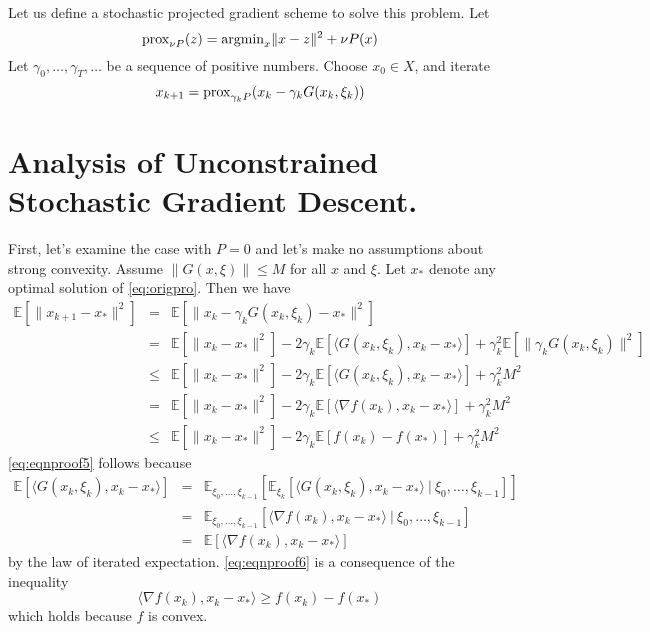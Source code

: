 Let us define a stochastic projected gradient scheme to solve this problem. Let
\begin{equation}\label{eq:stoprojgra}
{\rm prox}_{\nu P}(z)={\rm argmin}_x \|x-z\|^2+\nu P(x)
\end{equation}
Let $\gamma_0,\ldots,\gamma_T,\ldots$ be a sequence of positive numbers. Choose $x_0 \in X$, and iterate
\begin{equation}\label{eq:stoprojgraiter}
x_{k+1} ={\rm prox}_{\gamma_k P}(x_k-\gamma_k G(x_k,\xi_k))
\end{equation}

\section{Analysis of Unconstrained Stochastic Gradient Descent.}
First, let's examine the case with $P = 0$ and let's make no assumptions about strong convexity. Assume $\|G(x, \xi)\| \leq M$ for all $x$ and $\xi$. Let $x_*$ denote any optimal solution of \eqref{eq:origpro}. Then we have
\begin{eqnarray}
\mathbb{E}[\|x_{k+1}-x_*\|^2]&=&\mathbb{E}[\|x_{k}-\gamma_k G(x_k,\xi_k)-x_*\|^2]  \nonumber \\
&=&\mathbb{E}[\|x_{k}-x_*\|^2]- 2\gamma_k\mathbb{E}[\langle G(x_k,\xi_k), x_k-x_*\rangle ]+ \gamma_k^2 \mathbb{E}[\|\gamma_k G(x_k,\xi_k)\|^2]  \\
&\leq&\mathbb{E}[\|x_{k}-x_*\|^2]- 2\gamma_k\mathbb{E}[\langle G(x_k,\xi_k), x_k-x_*\rangle ]+ \gamma_k^2 M^2  \\
&=&\mathbb{E}[\|x_{k}-x_*\|^2]- 2\gamma_k\mathbb{E}[\langle \nabla f(x_k), x_k-x_*\rangle ]+ \gamma_k^2 M^2 \label{eq:eqnproof5} \\
&\leq& \mathbb{E}[\|x_{k}-x_*\|^2]- 2\gamma_k\mathbb{E}[f(x_k)-f(x_*)]+ \gamma_k^2 M^2 \label{eq:eqnproof6}
\end{eqnarray}
\eqref{eq:eqnproof5} follows because
\begin{eqnarray}
\mathbb{E}[\langle G(x_k,\xi_k), x_k-x_*\rangle ]&=&\mathbb{E}_{\xi_0,\ldots,\xi_{k-1}}[\mathbb{E}_{\xi_k}[\langle G(x_k,\xi_k), x_k-x_*\rangle\ |\ \xi_0,\ldots,\xi_{k-1} ]] \nonumber\\
&=&\mathbb{E}_{\xi_0,\ldots,\xi_{k-1}}[\langle \nabla f(x_k), x_k-x_*\rangle\ |\ \xi_0,\ldots,\xi_{k-1} ] \\
&=&\mathbb{E}[\langle \nabla f(x_k), x_k-x_*\rangle]
\end{eqnarray}
by the law of iterated expectation. \eqref{eq:eqnproof6} is a consequence of the inequality
\begin{equation}
\langle \nabla f(x_k), x_k-x_*\rangle \geq f(x_k)-f(x_*)
\end{equation}
which holds because $f$ is convex.

